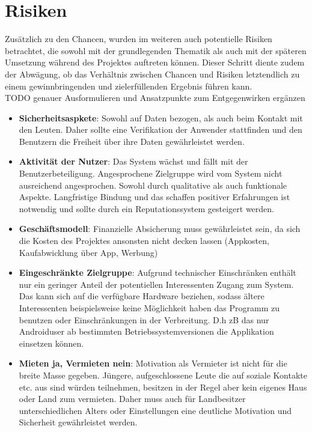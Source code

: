 
\section{Risiken}
Zusätzlich zu den Chancen, wurden im weiteren auch potentielle Risiken betrachtet, die sowohl mit der grundlegenden Thematik als auch mit der späteren Umsetzung während des Projektes auftreten können.
Dieser Schritt diente zudem der Abwägung, ob das Verhältnis zwischen Chancen und Risiken letztendlich zu einem gewinnbringenden und zielerfüllenden Ergebnis führen kann.\\
TODO genauer Ausformulieren und Ansatzpunkte zum Entgegenwirken ergänzen

\begin{itemize}
   \item \textbf{Sicherheitsaspkete}: Sowohl auf Daten bezogen, als auch beim Kontakt mit den Leuten. Daher sollte eine Verifikation der Anwender stattfinden und den Benutzern die Freiheit über ihre Daten gewährleistet werden.

   \item \textbf{Aktivität der Nutzer}: Das System wächst und fällt mit der Benutzerbeteiligung. Angesprochene Zielgruppe wird vom System nicht ausreichend angesprochen. Sowohl durch qualitative als auch funktionale Aspekte. Langfristige Bindung und das schaffen positiver Erfahrungen ist notwendig und sollte durch ein Reputationssystem gesteigert werden.

   \item \textbf{Geschäftsmodell}: Finanzielle Absicherung muss gewährleistet sein, da sich die Kosten des Projektes ansonsten nicht decken lassen 
   (Appkosten, Kaufabwicklung über App, Werbung)

   \item \textbf{Eingeschränkte Zielgruppe}:
   Aufgrund technischer Einschränken enthält nur ein geringer Anteil der potentiellen Interessenten Zugang zum System. Das kann sich auf die verfügbare Hardware beziehen, sodass ältere Interessenten beispielsweise keine Möglichkeit haben das Programm zu benutzen oder Einschränkungen in der Verbreitung. D.h zB das nur Androiduser ab bestimmten Betriebssystemversionen die Applikation einsetzen können.
     
   \item
   \textbf{Mieten ja, Vermieten nein}: Motivation als Vermieter ist nicht für die breite Masse gegeben. Jüngere, aufgeschlossene Leute die auf soziale Kontakte etc. aus sind würden teilnehmen, besitzen in der Regel aber kein eigenes Haus oder Land zum vermieten. Daher muss auch für Landbesitzer unterschiedlichen Alters oder Einstellungen eine deutliche Motivation und Sicherheit gewährleistet werden.


\end{itemize}
